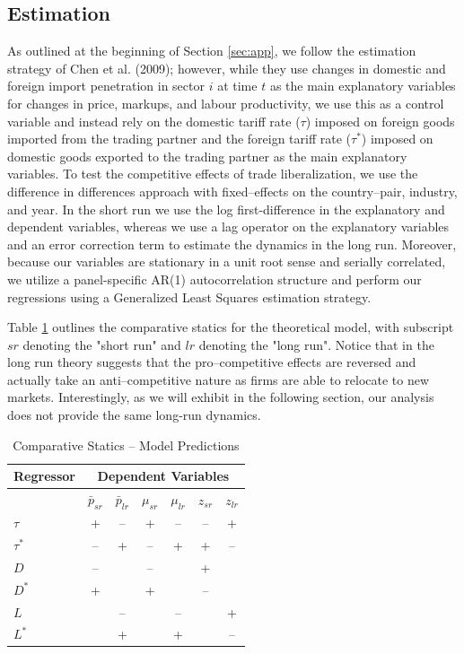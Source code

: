 \subsection{Estimation}
As outlined at the beginning of Section \ref{sec:app}, we follow the estimation strategy of Chen et al. (2009); however, while they use changes in domestic and foreign import penetration in sector $i$ at time $t$ as the main explanatory variables for changes in price, markups, and labour productivity, we use this as a control variable and instead rely on the domestic tariff rate ($\tau$) imposed on foreign goods imported from the trading partner and the foreign tariff rate ($\tau^*$) imposed on domestic goods exported to the trading partner as the main explanatory variables. To test the competitive effects of trade liberalization, we use the difference in differences approach with fixed--effects on the country--pair, industry, and year. In the short run we use the log first-difference in the explanatory and dependent variables, whereas we use a lag operator on the explanatory variables and an error correction term to estimate the dynamics in the long run. Moreover, because our variables are stationary in a unit root sense and serially correlated, we utilize a panel-specific AR(1) autocorrelation structure and perform our regressions using a Generalized Least Squares estimation strategy. 

Table \ref{tb:comp_stats} outlines the comparative statics for the theoretical model, with subscript $sr$ denoting the "short run" and $lr$ denoting the "long run". Notice that in the long run theory suggests that the pro--competitive effects are reversed and actually take an anti--competitive nature as firms are able to relocate to new markets. Interestingly, as we will exhibit in the following section, our analysis does not provide the same long-run dynamics.

\begin{center}
\begin{table}[ht] \caption{Comparative Statics -- Model Predictions}\label{tb:comp_stats}
\vspace{0.5cm}
{\small
\hfill{}
\begin{tabular}{|l|c|c|c|c|c|c|}
\hline
\textbf{Regressor}& \multicolumn{6}{|c|}{\textbf{Dependent Variables}}\\
\cline{2-7}
\hline
& $\bar{p}_{sr}$ & $\bar{p}_{lr}$ & $\mu_{sr}$ & $\mu_{lr}$ & $z_{sr}$ & $z_{lr}$ \\ \hline
$\tau$     & +  & -- & +  & -- & -- & + \\ \hline
$\tau^*$   & -- & +  & -- & +  & +  & --\\ \hline
$D$        & -- &    & -- &    & +  &   \\ \hline
$D^*$      & +  &    & +  &    & -- &   \\ \hline
$L$        &    & -- &    & -- &    & + \\ \hline
$L^*$      &    & +  &    & +  &    & --\\
\hline
\end{tabular}}
\hfill{}
\end{table}
\end{center}


